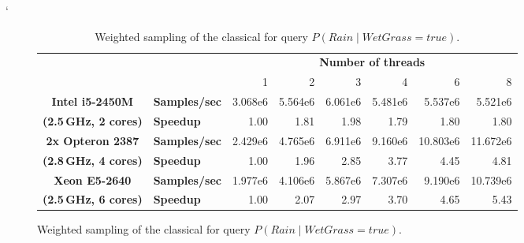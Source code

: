\documentclass[english,cover]{fitthesis} %
\begin{document}
\begin{table}[htb]
    \centering
    \catcode`
    \begin{adjustwidth}{-0.5cm}{-0.95cm} %
    {\small
    \begin{subfigure}[b]{\linewidth}
        \begin{tabular}{|c|l|r|r|r|r|r|r|}
            \cline{3-8}
            \multicolumn{2}{c|}{} & \multicolumn{6}{c|}{\textbf{Number of threads}}\\
            \cline{3-8}
            \multicolumn{2}{c|}{} & 1 & 2 & 3 & 4 & 6 & 8\\ %
            \hline
            \textbf{Intel i5-2450M} & \textbf{Samples/sec}
                & 3.068e6 & 5.564e6 & 6.061e6 & 5.481e6 & 5.537e6 & 5.521e6\\
            \cline{2-8}
            \footnotesize\textbf{(2.5\,GHz, 2 cores)} & \textbf{Speedup}
                & 1.00 & 1.81 & 1.98 & 1.79 & 1.80 & 1.80\\
            \hline \hline
            \textbf{2x Opteron 2387} & \textbf{Samples/sec}
                & 2.429e6 & 4.765e6 & 6.911e6 & 9.160e6 & 10.803e6 & 11.672e6\\
            \cline{2-8}
            \footnotesize\textbf{(2.8\,GHz, 4 cores)} & \textbf{Speedup}
                & 1.00 & 1.96 & 2.85 & 3.77 & 4.45 & 4.81\\
            \hline \hline
            \textbf{Xeon E5-2640} & \textbf{Samples/sec}
                & 1.977e6 & 4.106e6 & 5.867e6 & 7.307e6 & 9.190e6 & 10.739e6\\
            \cline{2-8}
            \footnotesize\textbf{(2.5\,GHz, 6 cores)} & \textbf{Speedup}
                & 1.00 & 2.07 & 2.97 & 3.70 & 4.65 & 5.43\\
            \hline
        \end{tabular}
        \caption{Weighted sampling of the classical  for query $P(Rain \mid WetGrass = true)$.}
    \end{subfigure}
    
}
\end{adjustwidth}
\end{table}
\end{document}

